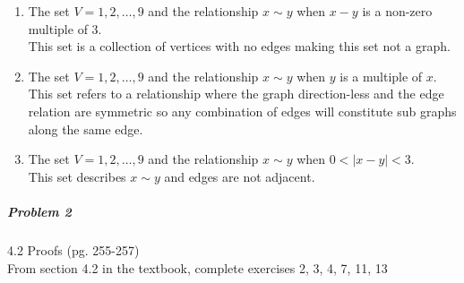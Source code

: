 \documentclass[11pt,a4paper]{article}
\begin{document}
\begin{enumerate}
            \begin{enumerate}
                \item The set $V={1,2,…,9}$ and the relationship $x\sim y$ when $x-y$ is a non-zero multiple of 3.\\
                    This set is a collection of vertices with no edges making this set not a graph.
                \item The set $V={1,2,…,9}$ and the relationship $x\sim y$ when $y$ is a multiple of $x$.\\
                This set refers to a relationship where the graph direction-less and the edge relation are symmetric so any combination of edges will constitute sub graphs along the same edge.
                \item The set $V={1,2,…,9}$ and the relationship $x\sim y$ when $0<|x−y|<3$.\\
                This set describes $x\sim y$ and edges are not adjacent.

            \end{enumerate}
        \end{enumerate}
	
	\subparagraph{Problem 2} 4.2 Proofs (pg. 255-257) \\
	
		From section 4.2 in the textbook, complete exercises 2, 3, 4, 7, 11, 13
\end{document}
